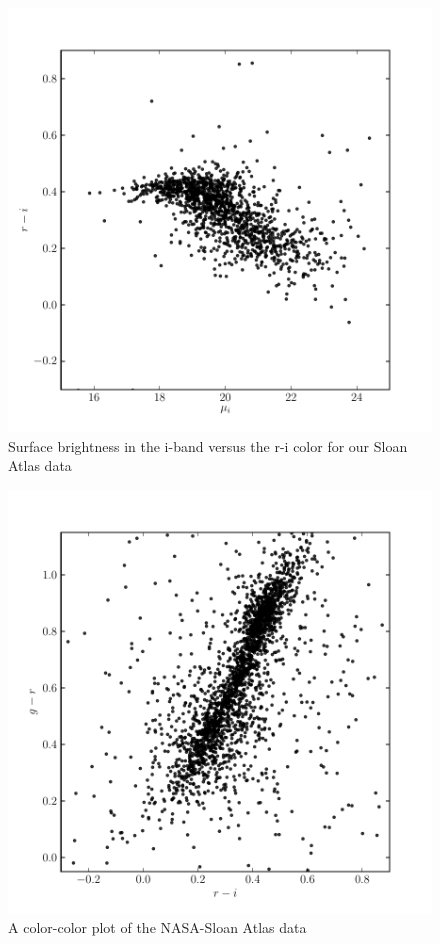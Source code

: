 \documentclass[12pt,preprint,pdftex]{aastex}
\begin{document}
\begin{figure}
\centering
\includegraphics[trim = 15mm 0mm 0mm 0mm]{method_sb2_sloan.pdf}
\caption{Surface brightness in the i-band versus the r-i color for our Sloan Atlas data}
\end{figure}

\begin{figure}
\centering
\includegraphics[trim = 15mm 0mm 0mm 0mm]{method_color_nsa.pdf}
\caption{A color-color plot of the NASA-Sloan Atlas data}
\end{figure}
\end{document}
